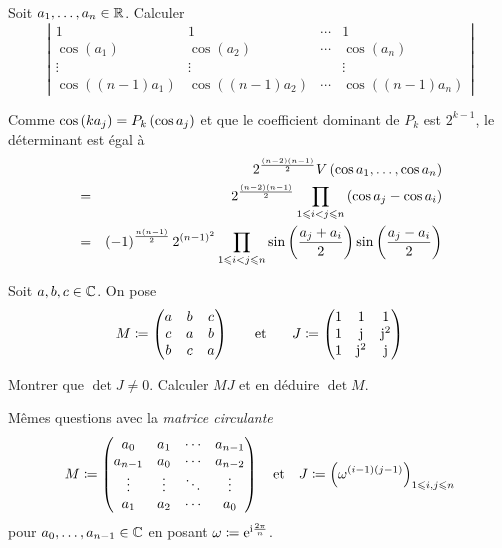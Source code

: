 \documentclass{magnolia}
\begin{document}
Soit $a_1,\ldots,a_n\in\mathbb{R}$. Calculer
\[\left|
  \begin{array}{cccc}
  1        & 1 & \cdots & 1\\
  \cos(a_1) & \cos(a_2) & \cdots & \cos(a_n)\\
  \vdots   &   \vdots   &         & \vdots\\
  \cos ((n-1)a_1) & \cos((n-1)a_2) & \cdots & \cos((n-1)a_n)
  \end{array}
  \right|\]
\begin{sol}
Comme $\cos\left(k a_j\right)=P_k\left(\cos a_j\right)$ et que le coefficient dominant
de $P_k$ est $2^{k-1}$, le déterminant est égal à 
\begin{eqnarray*}
& & 2^{\frac{\left(n-2\right)\left(n-1\right)}{2}}V\left(\cos a_1,\ldots,\cos a_n\right)\\
&=& 2^{\frac{\left(n-2\right)\left(n-1\right)}{2}}\prod_{1\leqslant i<j\leqslant n} \left(\cos a_j-\cos a_i\right)\\
&=& \left(-1\right)^{\frac{n\left(n-1\right)}{2}}2^{\left(n-1\right)^2}\prod_{1\leqslant i<j\leqslant n}
    \sin\left(\frac{a_j+a_i}{2}\right)\sin\left(\frac{a_j-a_i}{2}\right)
\end{eqnarray*}
\end{sol}

\begin{questions}
\question Soit $a,b,c\in\mathbb{C}$. On pose
  \[M\coloneqq\begin{pmatrix}
    a&b&c\\
    c&a&b\\
    b&c&a
  \end{pmatrix} \quad\quad\!\text{et}\quad\!\quad J\coloneqq\begin{pmatrix}
  1 & 1 & 1\\
  1 & {\rm j} & {\rm j}^2\\
  1 & {\rm j}^2 & {\rm j}
  \end{pmatrix}\]
  \begin{questions}
  \question Montrer que $\det J\neq 0$.
  \question Calculer $MJ$ et en déduire $\det M$.
  \end{questions}
\question Mêmes questions avec la \emph{matrice circulante}
  \[M\coloneqq\begin{pmatrix}
    a_0 & a_1 & \cdots & a_{n-1}\\
    a_{n-1} & a_0 & \cdots & a_{n-2}\\
    \vdots & \vdots & \ddots & \vdots\\
    a_1 & a_2 & \cdots & a_0
  \end{pmatrix} \quad\text{et}\quad 
  J\coloneqq \left(\omega^{(i-1)(j-1)}\right)_{1\leqslant i,j\leqslant n}\]
  pour $a_0,\ldots,a_{n-1}\in\mathbb{C}$ en posant $\omega\coloneqq {\rm e}^{{\rm i}\frac{2\pi}{n}}$.
\end{questions}
\end{document}
